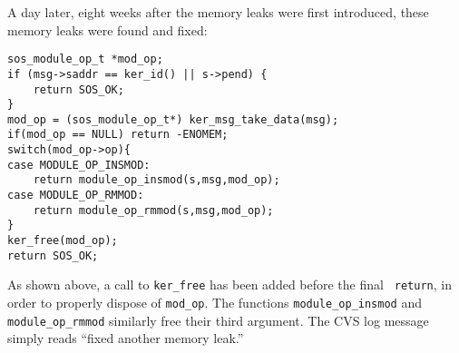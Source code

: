 A day later, eight weeks after the memory leaks were first
introduced, these memory leaks were found and fixed:

\begin{footnotesize}
\begin{verbatim}
sos_module_op_t *mod_op;
if (msg->saddr == ker_id() || s->pend) {
    return SOS_OK;
}
mod_op = (sos_module_op_t*) ker_msg_take_data(msg);
if(mod_op == NULL) return -ENOMEM;
switch(mod_op->op){
case MODULE_OP_INSMOD:
    return module_op_insmod(s,msg,mod_op);
case MODULE_OP_RMMOD:
    return module_op_rmmod(s,msg,mod_op);
}
ker_free(mod_op);
return SOS_OK;
\end{verbatim}
\end{footnotesize}

As shown above, a call to {\tt ker\_free} has been added before the final {\tt
  return}, in order to properly dispose of {\tt mod\_op}.
The functions {\tt module\_op\_insmod} and {\tt module\_op\_rmmod}
similarly free their third argument.
The CVS log message 
simply reads ``fixed another memory leak.''





